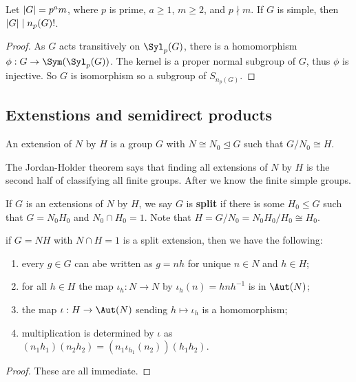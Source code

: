 \documentclass{article}
\begin{document}
\begin{proposition}
    Let $\left| G \right|=p^a m$, where $p$ is prime, $a\geq 1$, $m\geq 2$, and $p\nmid m$. If $G$ is simple, then $\left| G \right|\mid n_p(G)!$.\begin{proof}
        As $G$ acts transitively on $\Syl_p(G)$, there is a homomorphism $\phi:G\rightarrow \Sym(\Syl_p(G))$. The kernel is a proper normal subgroup of $G$, thus $\phi$ is injective. So $G$ is isomorphism so a subgroup of $S_{n_p(G)}$.
    \end{proof}
\end{proposition}

\subsection{Extenstions and semidirect products}

\begin{definition}
    An extension of $N$ by $H$ is a group $G$ with $N\cong N_0 \unlhd G$ such that $G/N_0\cong H$.
\end{definition}

The Jordan-Holder theorem says that finding all extensions of $N$ by $H$ is the second half of classifying all finite groups. After we know the finite simple groups.

\begin{definition}
    If $G$ is an extensions of $N$ by $H$, we say $G$ is \textbf{split} if there is some $H_0\leq G$ such that $G=N_0H_0$ and $N_0\cap H_0=1$. Note that $H=G/N_0 = N_0H_0/H_0\cong H_0$.
\end{definition}

\begin{proposition}
    if $G=NH$ with $N\cap H=1$ is a split extension, then we have the following: \begin{enumerate}
        \item every $g\in G$ can abe written as $g=nh$ for unique $n\in N$ and $h\in H$;
        \item for all $h\in H$ the map $\iota_h:N\rightarrow N$ by $\iota_h(n)=hnh^{-1}$ is in $\Aut(N)$;
        \item the map $\iota:H\rightarrow \Aut(N)$ sending $h\mapsto \iota_h$ is a homomorphism;
        \item multiplication is determined by $\iota$ as $(n_1h_1)(n_2h_2)=(n_1\iota_{h_1}(n_2))(h_1h_2)$.
    \end{enumerate}
    \begin{proof}
        These are all immediate.
    \end{proof}
\end{proposition}
\end{document}
